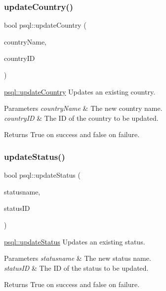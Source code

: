 \subsubsection{\texorpdfstring{update\+Country()}{updateCountry()}}
{\footnotesize\ttfamily bool psql\+::update\+Country (\begin{DoxyParamCaption}\item[{Q\+String}]{country\+Name,  }\item[{int}]{country\+ID }\end{DoxyParamCaption})}



\mbox{\hyperlink{classpsql_ae662278c5fb8ff3471ee1442e69482e2}{psql\+::update\+Country}} Updates an existing country. 


\begin{DoxyParams}{Parameters}
{\em country\+Name} & The new country name. \\
\hline
{\em country\+ID} & The ID of the country to be updated. \\
\hline
\end{DoxyParams}
\begin{DoxyReturn}{Returns}
True on success and false on failure. 
\end{DoxyReturn}
\mbox{\label{classpsql_a620364c99c98e20720908deb045536a0}} 
\subsubsection{\texorpdfstring{update\+Status()}{updateStatus()}}
{\footnotesize\ttfamily bool psql\+::update\+Status (\begin{DoxyParamCaption}\item[{Q\+String}]{statusname,  }\item[{int}]{status\+ID }\end{DoxyParamCaption})}



\mbox{\hyperlink{classpsql_a620364c99c98e20720908deb045536a0}{psql\+::update\+Status}} Updates an existing status. 


\begin{DoxyParams}{Parameters}
{\em statusname} & The new status name. \\
\hline
{\em status\+ID} & The ID of the status to be updated. \\
\hline
\end{DoxyParams}
\begin{DoxyReturn}{Returns}
True on success and false on failure. 
\end{DoxyReturn}
\mbox{\label{classpsql_a4c23d467c41e155a55c38b1cefb9b54b}} 
